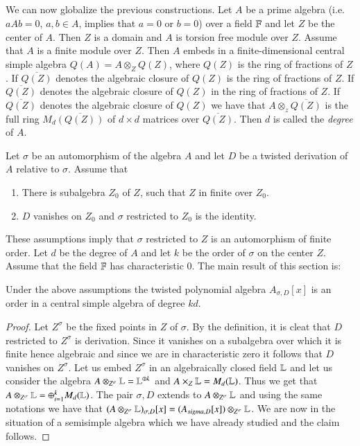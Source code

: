 \subsection{}\label{art4-subsec-1.5}
We can now globalize the previous constructions. Let $A$ be a prime algebra (i.e. $aAb =0$, $a, b\in A$, implies that $a=0$ or $b=0$) over a field $\mathbb{F}$ and let $Z$ be the center of $A$. Then $Z$ is a domain and $A$ is torsion free module over $Z$. Assume that $A$ is a finite module over $Z$. Then $A$ embeds in a finite-dimensional central simple algebra $Q(A) = A\otimes_{Z}Q(Z)$, where $Q(Z)$ is the ring of fractions of $Z$. If $\overline{Q(Z)}$ denotes the algebraic closure of $Q(Z)$ is the ring of fractions of $Z$. If $\overline{Q(Z)}$ denotes the algebraic closure of $Q(Z)$ in the ring of fractions of $Z$. If $\overline{Q(Z)}$ denotes the algebraic closure of $Q(Z)$ we have that $A\otimes_{z}\overline{Q(Z)}$ is the full ring $M_{d}\overline{(Q(Z))}$ of $d \times d$ matrices over $\overline{Q(Z)}$. Then $d$ is called the \textit{degree} of $A$.

Let $\sigma$ be an automorphism of the algebra $A$ and let $D$ be a twisted derivation of $A$ relative to $\sigma$. Assume that
\begin{enumerate}[(\rm a)]
\item There is subalgebra $Z_{0}$ of $Z$, such that $Z$ in finite over $Z_{0}$.
\item $D$ vanishes on $Z_{0}$ and $\sigma$ restricted to $Z_{0}$ is the identity. 
\end{enumerate}

These assumptions imply that $\sigma $ restricted to $Z$ is an automorphism of finite order. Let $d$ be the degree of $A$ and let $k$ be the order of $\sigma $ on the center $Z$. Assume that the field $\mathbb{F}$ has characteristic 0. The main result of this section is:

\begin{theorem*}
Under the above assumptions the twisted polynomial algebra $A_{\sigma, D}[x]$ is an order in a central simple algebra of degree $kd$.
\end{theorem*}

\begin{proof}
Let $Z^{\sigma}$ be the fixed points in $Z$ of $\sigma$. By the definition, it is cleat that $D$ restricted to $Z^{\sigma}$ is derivation. Since it vanishes on a subalgebra over which it is finite hence algebraic and since we are in characteristic zero it follows that $D$ vanishes on $Z^{\sigma}$. Let us embed $Z^{\sigma}$ in an algebraically closed field $\mathbb{L}$ and let us consider the algebra $A\otimes_{Z^{\sigma}}\mathbb{L} = \mathbb{L}^{\oplus k}$ and $A \times_{Z}\mathbb{L} = M_{d}(\mathbb{L})$. Thus we get that $A\otimes_{Z^{\sigma}}\mathbb{L}=\oplus_{i=1}^{k}M_{d}(\mathbb{L})$. The pair $\sigma, D$ extends to $A\otimes_{Z^{\sigma}}\mathbb{L}$ and using the same notations we have that $(A\otimes_{Z^{\sigma}}\mathbb{L})_{\sigma, D}[x] = (A_{sigma, D}[x])\otimes_{Z^{\sigma}} \mathbb{L}$. We are now in the situation of a semisimple algebra which we have already studied and the claim follows.
\end{proof}

